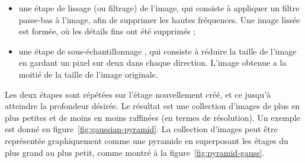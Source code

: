 \begin{itemize}
    \item une étape de \og lissage \fg (ou filtrage) de l'image, qui consiste à appliquer un filtre passe-bas à l'image, afin de supprimer les hautes fréquences. Une image lissée est formée, où les détails fins ont été supprimés ;
    \item une étape de \og sous-échantillonnage \fg, qui consiste à réduire la taille de l'image en gardant un pixel sur deux dans chaque direction. L'image obtenue a la moitié de la taille de l'image originale.
\end{itemize}

\bigskip

Les deux étapes sont répétées sur l'étage nouvellement créé, et ce jusqu'à atteindre la profondeur désirée. Le résultat est une collection d'images de plus en plus petites et de moins en moins raffinées (en termes de résolution). Un exemple est donné en figure~\ref{fig:gaussian-pyramid}. La collection d'images peut être représentée graphiquement comme une pyramide en superposant les étages du plus grand au plus petit, comme montré à la figure~\ref{fig:pyramid-gauss}.

